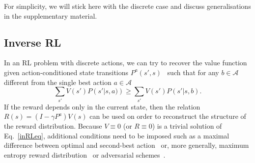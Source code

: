\documentclass{article}
\begin{document}
%
For simplicity, we will stick here with the discrete case and discuss generalisations in the supplementary material.

\subsection{Inverse RL\label{invRL}}

In an RL problem with discrete actions, we can try to recover 
the value function given action-conditioned state transitions $P^a(s',s)$~\cite{ng2000algorithms}
such that for any $b \in \mathcal{A}$ different from the single best action $a \in \mathcal{A}$ 
\begin{equation}
	\sum_{s'} V\left(s'\right) P\left(s'|s,a) \right)
	\ge\sum_{s'} V\left(s'\right) P\left(s'|s,b\right).
	\label{inRLeq}
\end{equation}
If the reward depends only in the current state,
then the relation $R(s)=\left(I-\gamma P^{a}\right)V(s)$ can be used on order to reconstruct 
the structure of the reward distribution. Because $V\equiv 0$ (or $R\equiv 0$) is a trivial 
solution of Eq.~\ref{inRLeq},
additional conditions need to be imposed such as a maximal difference between optimal and second-best action~\cite{ng2000algorithms}  or, more generally, maximum entropy reward 
distribution~\cite{ziebart2008maximum} or adversarial schemes~\cite{pfau2016connecting}. 
\end{document}
